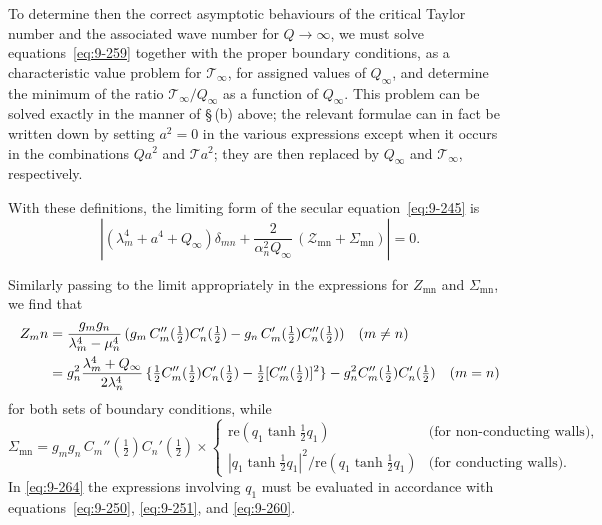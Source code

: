 To determine then the correct asymptotic behaviours of the critical Taylor number and the associated wave number for $Q \to \infty$, we must solve equations~\eqref{eq:9-259} together with the proper boundary conditions, as a characteristic value problem for $\mathscr{T}_\infty$, for assigned values of $Q_\infty$, and determine the minimum of the ratio $\mathscr{T}_\infty/Q_\infty$ as a function of $Q_\infty$. This problem can be solved exactly in the manner of \S\,(b) above; the relevant formulae can in fact be written down by setting $a^2 = 0$ in the various expressions except when it occurs in the combinations $Qa^2$ and $\mathscr{T} a^2$; they are then replaced by $Q_\infty$ and $\mathscr{T}_\infty$, respectively.

With these definitions, the limiting form of the secular equation~\eqref{eq:9-245} is
\begin{equation}
\left|(\lambda_m^4 + a^4 + Q_\infty)\delta_{mn} + \frac{2}{\alpha_n^2 Q_\infty}\,(\mathscr{Z}_\mathrm{mn} + \Sigma_\mathrm{mn})\right| = 0. \label{eq:9-262}
\end{equation}

Similarly passing to the limit appropriately in the expressions for $Z_\mathrm{mn}$ and $\Sigma_\mathrm{mn}$, we find that
\begin{align}
Z_\mathrm{mn} &= \frac{g_m g_n}{\lambda_m^4 - \mu_n^4}\,(g_m\, C_m''(\tfrac{1}{2})C_n'(\tfrac{1}{2}) - g_n\, C_m'(\tfrac{1}{2})C_n''(\tfrac{1}{2})) \quad (m \ne n) \notag \\
&= g_n^2\frac{\lambda_m^4 + Q_\infty}{2\lambda_n^4}\,\{\tfrac{1}{2}C_m''(\tfrac{1}{2})C_n'(\tfrac{1}{2}) - \tfrac{1}{2}[C_m''(\tfrac{1}{2})]^2\} - g_n^2 C_m''(\tfrac{1}{2})C_n'(\tfrac{1}{2}) \quad (m = n) \label{eq:9-263}
\end{align}
for both sets of boundary conditions, while
\begin{equation}
\Sigma_\mathrm{mn} = g_m g_n\, C_m''(\tfrac{1}{2})C_n'(\tfrac{1}{2}) \times
\begin{cases}
\mathrm{re}(q_1\tanh\tfrac{1}{2}q_1) & \text{(for non-conducting walls),} \\
|q_1\tanh\tfrac{1}{2}q_1|^2/\mathrm{re}(q_1\tanh\tfrac{1}{2}q_1) & \text{(for conducting walls).}
\end{cases} \label{eq:9-264}
\end{equation}
In \eqref{eq:9-264} the expressions involving $q_1$ must be evaluated in accordance with equations~\eqref{eq:9-250}, \eqref{eq:9-251}, and \eqref{eq:9-260}.

